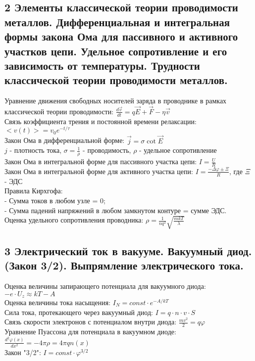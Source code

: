 \documentclass[a4paper,12pt]{article}
\begin{document}
\subsection{2	Элементы классической теории проводимости металлов. Дифференциальная и интегральная формы закона Ома для пассивного и активного участков цепи. Удельное сопротивление и его зависимость от температуры. Трудности классической теории проводимости металлов.}
Уравнение движения свободных носителей заряда в проводнике в рамках классической теории проводимости: $\frac{d \vec{v}}{dt} = q \vec{E} + \vec{F} - \eta \vec{v}$\\
Связь коэффициента трения и постоянной времени релаксации: $<v(t)> = v_0 e^{-t/\tau}$\\
Закон Ома в дифференциальной форме: $\vec{j} = \sigma \cot  \vec{E}$\\
$j$ - плотность тока, $\sigma = \frac{1}{\rho}$ - проводимость, $\rho$ - удельное сопротивление\\
Закон Ома в интегральной форме для пассивного участка цепи: $I = \frac{U}{R}$\\
Закон Ома в интегральной форме для активного участка цепи: $I = \frac{-\Delta \varphi \pm \Xi}{R}$, где $\Xi$ - ЭДС\\ 
Правила Кирхгофа:\\
- Сумма токов в любом узле = 0;\\
- Сумма падений напряжений в любом замкнутом контуре = сумме ЭДС.\\
Оценка удельного сопротивления проводника: $\rho = \frac{1}{nq^2} \sqrt{\frac{mkT}{\lambda}}$\\


\subsection{3	Электрический ток в вакууме. Вакуумный диод. (Закон 3/2). Выпрямление электрического тока.}
Оценка величины запирающего потенциала для вакуумного диода: $-e\cdot U_z \approx kT - A$\\
Оценка величины тока насыщения: $I_N = const \cdot e^{-A/kT}$\\
Сила тока, протекающего через вакуумный диод: $I = q\cdot n \cdot v \cdot S$\\
Связь скорости электронов с потенциалом внутри диода: $\frac{mv^2}{2} = q \varphi$\\
Уравнение Пуассона для потенциала в вакуумном диоде: $\frac{d^2\varphi (x)}{dx^2} = - 4\pi \rho = 4 \pi q n (x)$\\
Закон "3/2": $I = const \cdot \varphi ^{3/2}$\\
\end{document}
